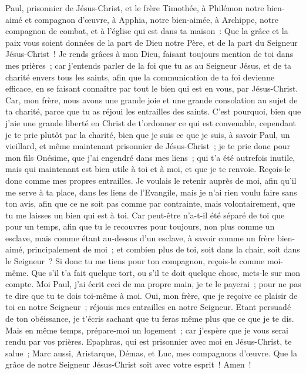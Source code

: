 \begin{multicols}{2}
\VerseOne{}Paul, prisonnier de Jésus-Christ, et le frère Timothée, à Philémon notre bien-aimé et compagnon d'œuvre,
à Apphia, notre bien-aimée, à Archippe, notre compagnon de combat, et à l'église qui est dans ta maison~:
Que la grâce et la paix vous soient données de la part de Dieu notre Père, et de la part du Seigneur Jésus-Christ~!
Je rends grâces à mon Dieu, faisant toujours mention de toi dans mes prières~;
car j'entends parler de la foi que tu as au Seigneur Jésus, et de ta charité envers tous les saints,
afin que la communication de ta foi devienne efficace, en se faisant connaître par tout le bien qui est en vous, par Jésus-Christ.
Car, mon frère, nous avons une grande joie et une grande consolation au sujet de ta charité, parce que tu as réjoui les entrailles des saints.
C'est pourquoi, bien que j'aie une grande liberté en Christ de t'ordonner ce qui est convenable,
cependant je te prie plutôt par la charité, bien que je suis ce que je suis, à savoir Paul, un vieillard, et même maintenant prisonnier de Jésus-Christ~;
je te prie donc pour mon fils Onésime, que j'ai engendré dans mes liens~;
qui t'a été autrefois inutile, mais qui maintenant est bien utile à toi et à moi, et que je te renvoie.
Reçois-le donc comme mes propres entrailles.
Je voulais le retenir auprès de moi, afin qu'il me serve à ta place, dans les liens de l'Evangile,
mais je n'ai rien voulu faire sans ton avis, afin que ce ne soit pas comme par contrainte, mais volontairement, que tu me laisses un bien qui est à toi.
Car peut-être n'a-t-il été séparé de toi que pour un temps, afin que tu le recouvres pour toujours,
non plus comme un esclave, mais comme étant au-dessus d'un esclave, à savoir comme un frère bien-aimé, principalement de moi~; et combien plus de toi, soit dans la chair, soit dans le Seigneur~?
Si donc tu me tiens pour ton compagnon, reçois-le comme moi-même.
Que s'il t'a fait quelque tort, ou s'il te doit quelque chose, mets-le sur mon compte.
Moi Paul, j'ai écrit ceci de ma propre main, je te le payerai~; pour ne pas te dire que tu te dois toi-même à moi.
Oui, mon frère, que je reçoive ce plaisir de toi en notre Seigneur~; réjouis mes entrailles en notre Seigneur.
Etant persuadé de ton obéissance, je t'écris sachant que tu feras même plus que ce que je te dis.
Mais en même temps, prépare-moi un logement~; car j'espère que je vous serai rendu par vos prières.
Epaphras, qui est prisonnier avec moi en Jésus-Christ, te salue~;
Marc aussi, Aristarque, Démas, et Luc, mes compagnons d'œuvre.
Que la grâce de notre Seigneur Jésus-Christ soit avec votre esprit~! Amen~!
\PPE{}
\end{multicols}
